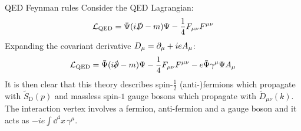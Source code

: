 \begin{example}{QED Feynman rules}{}
  Consider the QED Lagrangian:
  \begin{equation}
    \lag_\text{QED} = \bar{\Psi} (i \slashed{\covder} - m) \Psi - \frac{1}{4} F_{\mu \nu} F^{\mu \nu}
  \end{equation}
  Expanding the covariant derivative $ D_\mu = \partial_\mu + i e A_\mu $:
  \begin{equation*}
    \lag_\text{QED} = \bar{\Psi} (i \slashed{\pa} - m) \Psi - \frac{1}{4} F_{\mu \nu} F^{\mu \nu} - e \bar{\Psi} \gamma^\mu \Psi A_\mu
  \end{equation*}
  It is then clear that this theory describes spin-$ \frac{1}{2} $ (anti-)fermions which propagate with $ \tilde{S}_\text{D}(p) $ and massless spin-$ 1 $ gauge bosons which propagate with $ \tilde{D}_{\mu \nu}(k) $. The interaction vertex involves a fermion, anti-fermion and a gauge boson and it acts as $ -i e \int \dd^4x\, \gamma^\mu $.
\end{example}










